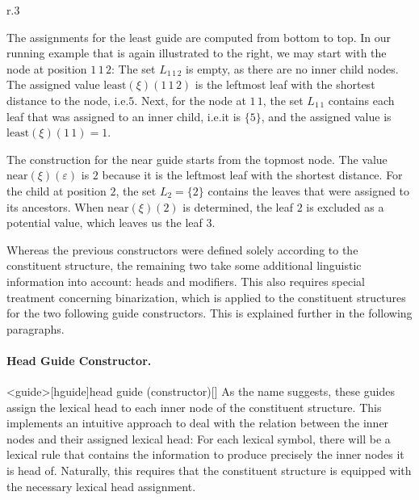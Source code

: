\documentclass[../../document.tex]{subfiles}
\begin{document}
    \needspace{3cm}
    \begin{wrapfigure}[6]{r}{.3\linewidth}
        \centering
        
    \end{wrapfigure}
    The assignments for the least guide are computed from bottom to top.
    In our running example that is again illustrated to the right, we may start with the node at position \(1\,1\,2\): The set \(L_{1\,1\,2}\) is empty, as there are no inner child nodes. The assigned value \(\mathrm{least}(\xi)(1\,1\,2)\) is the leftmost leaf with the shortest distance to the node, i.e.\@ \(5\).
    Next, for the node at \(1\,1\), the set \(L_{1\,1}\) contains each leaf that was assigned to an inner child, i.e.\@ it is \(\{5\}\), and the assigned value is \(\mathrm{least}(\xi)(1\,1) = 1\).
    \exampleqed

    \begin{example}
        The construction for the near guide starts from the topmost node.
        The value \(\mathrm{near}(\xi)(\varepsilon)\) is \(2\) because it is the leftmost leaf with the shortest distance.
        For the child at position \(2\), the set \(L_{2} = \{2\}\) contains the leaves that were assigned to its ancestors.
        When \(\mathrm{near}(\xi)(2)\) is determined, the leaf \(2\) is excluded as a potential value, which leaves us the leaf \(3\).
    \end{example}

    Whereas the previous constructors were defined solely according to the constituent structure, the remaining two take some additional linguistic information into account: heads and modifiers.
    This also requires special treatment concerning binarization, which is applied to the constituent structures for the two following guide constructors.
    This is explained further in the following paragraphs.

    \paragraph{Head Guide Constructor.}<guide>[hguide]{head guide (constructor)}[]
    As the name suggests, these guides assign the lexical head to each inner node of the constituent structure.
    This implements an intuitive approach to deal with the relation between the inner nodes and their assigned lexical head: For each lexical symbol, there will be a lexical rule that contains the information to produce precisely the inner nodes it is head of.
    Naturally, this requires that the constituent structure is equipped with the necessary lexical head assignment.
\end{document}
